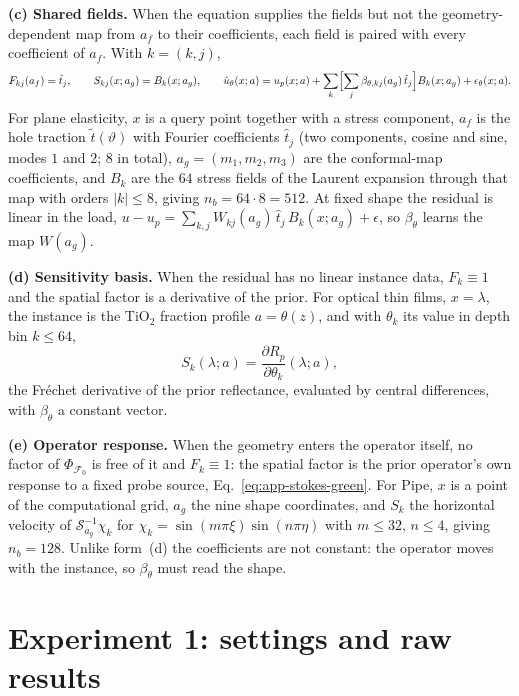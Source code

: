 \documentclass{article}
\begin{document}
\textbf{(c) Shared fields.}
When the equation supplies the fields but not the geometry-dependent map from $a_f$ to their
coefficients, each field is paired with every coefficient of $a_f$. With $k=(k,j)$,
\begin{equation}
F_{kj}(a_f)=\hat t_j,
\qquad
S_{kj}(x;a_g)=B_k(x;a_g),
\qquad
\hat u_\theta(x;a)=u_p(x;a)+\sum_{k}\Bigl[\sum_{j}\beta_{\theta,kj}(a_g)\,\hat t_j\Bigr]B_k(x;a_g)+\epsilon_\theta(x;a).
\label{eq:fac-shared}
\end{equation}
For plane elasticity, $x$ is a query point together with a stress component, $a_f$ is the hole
traction $\tilde t(\vartheta)$ with Fourier coefficients $\hat t_j$ (two components, cosine and
sine, modes $1$ and $2$; $8$ in total), $a_g=(m_1,m_2,m_3)$ are the conformal-map coefficients,
and $B_k$ are the $64$ stress fields of the Laurent expansion through that map with orders
$|k|\le8$, giving $n_b=64\cdot8=512$. At fixed shape the residual is linear in the load,
$u-u_p=\sum_{k,j}W_{kj}(a_g)\,\hat t_j\,B_k(x;a_g)+\epsilon$, so $\beta_\theta$ learns the map
$W(a_g)$.

\textbf{(d) Sensitivity basis.}
When the residual has no linear instance data, $F_k\equiv1$ and the spatial factor is a
derivative of the prior. For optical thin films, $x=\lambda$, the instance is the TiO$_2$
fraction profile $a=\theta(z)$, and with $\theta_k$ its value in depth bin $k\le 64$,
\begin{equation}
S_k(\lambda;a)=\frac{\partial R_p}{\partial\theta_k}(\lambda;a),
\label{eq:fac-optical}
\end{equation}
the Fr\'echet derivative of the prior reflectance, evaluated by central differences, with
$\beta_\theta$ a constant vector.

\textbf{(e) Operator response.}
When the geometry enters the operator itself, no factor of $\Phi_{\mathcal F_0}$ is free of
it and $F_k\equiv1$: the spatial factor is the prior operator's own response to a fixed
probe source, Eq.~\ref{eq:app-stokes-green}. For Pipe, $x$ is a point of the computational
grid, $a_g$ the nine shape coordinates, and $S_k$ the horizontal velocity of
$\mathcal{S}_{a_g}^{-1}\chi_k$ for $\chi_k=\sin(m\pi\xi)\sin(n\pi\eta)$ with $m\le32$,
$n\le4$, giving $n_b=128$. Unlike form~(d) the coefficients are not constant: the operator
moves with the instance, so $\beta_\theta$ must read the shape.


\section{Experiment 1: settings and raw results}
\end{document}
